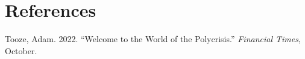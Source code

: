 \documentclass[
  a4paper,
  openany]{book}
\newlength{\cslhangindent}
\newenvironment{CSLReferences}[2] %
 {\begin{list}{}{%
  \setlength{\itemindent}{0pt}
  \setlength{\leftmargin}{0pt}
  \setlength{\parsep}{0pt}
  \ifodd #1
   \setlength{\leftmargin}{\cslhangindent}
   \setlength{\itemindent}{-1\cslhangindent}
  \fi
  \setlength{\itemsep}{#2\baselineskip}}}
 {\end{list}}
\begin{document}

\chapter*{References}\label{references}


\label{refs}
\begin{CSLReferences}{1}{0}
Tooze, Adam. 2022. {``Welcome to the World of the Polycrisis.''}
\emph{Financial Times}, October.

\end{CSLReferences}


\backmatter
\end{document}
